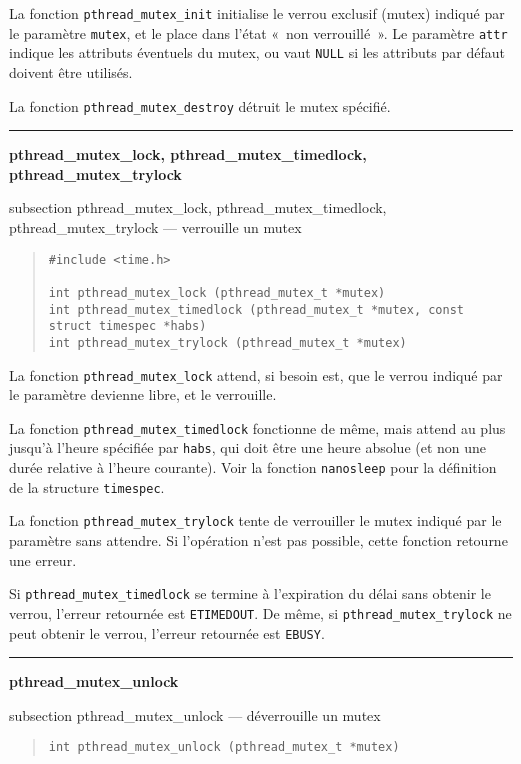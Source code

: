 \documentclass [twoside] {report}
\newcommand {\primitive} [1]
    {
	{\large \bf #1}
	\addcontentsline {toc} {subsection} {#1}
    }
\newcommand {\separation}
    {
	\vspace {7mm}
	\nopagebreak
	\hrule
    }
\begin{document}
La fonction \verb|pthread_mutex_init| initialise le verrou exclusif
(mutex) indiqué par le paramètre \texttt {mutex}, et le place dans
l'état «~non verrouillé~». Le paramètre \texttt {attr} indique les
attributs éventuels du mutex, ou vaut \texttt {NULL} si les attributs
par défaut doivent être utilisés.

La fonction \verb|pthread_mutex_destroy| détruit le mutex spécifié.


\separation
\primitive {pthread\_mutex\_lock, pthread\_mutex\_timedlock, pthread\_mutex\_trylock} --- verrouille un mutex

\begin {quote}
\begin {verbatim}
#include <time.h>

int pthread_mutex_lock (pthread_mutex_t *mutex)
int pthread_mutex_timedlock (pthread_mutex_t *mutex, const struct timespec *habs)
int pthread_mutex_trylock (pthread_mutex_t *mutex)
\end{verbatim}
\end {quote}

La fonction \verb|pthread_mutex_lock| attend, si besoin est, que le
verrou indiqué par le paramètre devienne libre, et le verrouille.

La fonction \verb|pthread_mutex_timedlock| fonctionne de même, mais
attend au plus jusqu'à l'heure spécifiée par \texttt {habs}, qui
doit être une heure absolue (et non une durée relative à l'heure
courante). Voir la fonction \texttt {nanosleep} pour la définition
de la structure \texttt {timespec}.

La fonction \verb|pthread_mutex_trylock| tente de verrouiller le mutex
indiqué par le paramètre sans attendre. Si l'opération n'est pas
possible, cette fonction retourne une erreur.

Si \verb|pthread_mutex_timedlock| se termine à l'expiration du délai
sans obtenir le verrou, l'erreur retournée est \texttt {ETIMEDOUT}.
De même, si \verb|pthread_mutex_trylock| ne peut obtenir le verrou,
l'erreur retournée est \texttt {EBUSY}.


\separation
\primitive {pthread\_mutex\_unlock} --- déverrouille un mutex

\begin {quote}
\begin {verbatim}
int pthread_mutex_unlock (pthread_mutex_t *mutex)
\end{verbatim}
\end {quote}
\end{document}

